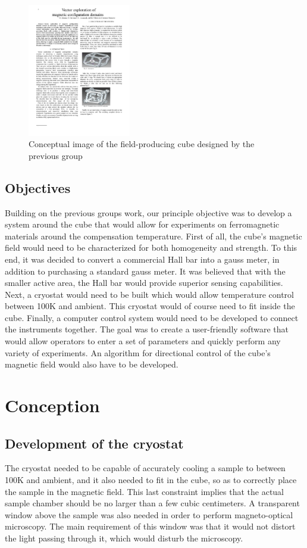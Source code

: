 \documentclass[journal]{IEEEtran}
\begin{document}
\begin{figure}[h]
\centering
\includegraphics[width=0.4\textwidth, height = 0.4\textwidth]{cube}
\caption{Conceptual image of the field-producing cube designed by the previous group}
\label{f cube}
\end{figure}

\subsection{Objectives}
Building on the previous groups work, our principle objective was to develop a system around the cube that would allow for experiments on ferromagnetic materials around the compensation temperature. First of all, the cube's magnetic field would need to be characterized for both homogeneity and strength. To this end, it was decided to convert a commercial Hall bar into a gauss meter, in addition to purchasing a standard gauss meter. It was believed that with the smaller active area, the Hall bar would provide superior sensing capabilities. Next, a cryostat would need to be built which would allow temperature control between 100K and ambient. This cryostat would of course need to fit inside the cube. Finally, a computer control system would need to be developed to connect the instruments together. The goal was to create a user-friendly software that would allow operators to enter a set of parameters and quickly perform any variety of experiments. An algorithm for directional control of the cube's magnetic field would also have to be developed. 



\section{Conception}
\subsection{Development of the cryostat}
The cryostat needed to be capable of accurately cooling a sample to between 100K and ambient, and it also needed to fit in the cube, so as to correctly place the sample in the magnetic field. This last constraint implies that the actual sample chamber should be no larger than a few cubic centimeters. A transparent window above the sample was also needed in order to perform magneto-optical microscopy. The main requirement of this window was that it would not distort the light passing through it, which would disturb the microscopy.
\end{document}

